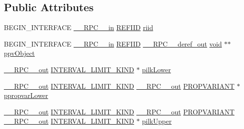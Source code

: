 \subsection*{Public Attributes}
\begin{DoxyCompactItemize}
\item 
B\+E\+G\+I\+N\+\_\+\+I\+N\+T\+E\+R\+F\+A\+CE \hyperlink{rpcsal_8h_a20b7f6da600a05c8b541659f14f7f0e6}{\+\_\+\+\_\+\+R\+P\+C\+\_\+\+\_\+in} \hyperlink{px__win__ds_8c_a80ec49c8ae61e234197d5071d2df497d}{R\+E\+F\+I\+ID} \hyperlink{struct_i_interval_vtbl_a5093e97add4aa256c72f191a990ca814}{riid}
\item 
B\+E\+G\+I\+N\+\_\+\+I\+N\+T\+E\+R\+F\+A\+CE \hyperlink{rpcsal_8h_a20b7f6da600a05c8b541659f14f7f0e6}{\+\_\+\+\_\+\+R\+P\+C\+\_\+\+\_\+in} \hyperlink{px__win__ds_8c_a80ec49c8ae61e234197d5071d2df497d}{R\+E\+F\+I\+ID} \hyperlink{rpcsal_8h_a23bc188526f10656f9c79d950f6c3192}{\+\_\+\+\_\+\+R\+P\+C\+\_\+\+\_\+deref\+\_\+out} \hyperlink{sound_8c_ae35f5844602719cf66324f4de2a658b3}{void} $\ast$$\ast$ \hyperlink{struct_i_interval_vtbl_a2432190272c929f87bec2e06fa0475a5}{ppv\+Object}
\item 
\hyperlink{rpcsal_8h_aa518a2c78d44d75f3685c32c455c5ed8}{\+\_\+\+\_\+\+R\+P\+C\+\_\+\+\_\+out} \hyperlink{structuredquery_8h_a9a883b8387799efbe99defa438412914}{I\+N\+T\+E\+R\+V\+A\+L\+\_\+\+L\+I\+M\+I\+T\+\_\+\+K\+I\+ND} $\ast$ \hyperlink{struct_i_interval_vtbl_a1e348828daee912b1bfc3bfdddcfc001}{pilk\+Lower}
\item 
\hyperlink{rpcsal_8h_aa518a2c78d44d75f3685c32c455c5ed8}{\+\_\+\+\_\+\+R\+P\+C\+\_\+\+\_\+out} \hyperlink{structuredquery_8h_a9a883b8387799efbe99defa438412914}{I\+N\+T\+E\+R\+V\+A\+L\+\_\+\+L\+I\+M\+I\+T\+\_\+\+K\+I\+ND} \hyperlink{rpcsal_8h_aa518a2c78d44d75f3685c32c455c5ed8}{\+\_\+\+\_\+\+R\+P\+C\+\_\+\+\_\+out} \hyperlink{propidl_8h_ae902c1757cd16052896846fa4ebb88d8}{P\+R\+O\+P\+V\+A\+R\+I\+A\+NT} $\ast$ \hyperlink{struct_i_interval_vtbl_a651120f300ba61843d2a0cc79e305c56}{ppropvar\+Lower}
\item 
\hyperlink{rpcsal_8h_aa518a2c78d44d75f3685c32c455c5ed8}{\+\_\+\+\_\+\+R\+P\+C\+\_\+\+\_\+out} \hyperlink{structuredquery_8h_a9a883b8387799efbe99defa438412914}{I\+N\+T\+E\+R\+V\+A\+L\+\_\+\+L\+I\+M\+I\+T\+\_\+\+K\+I\+ND} \hyperlink{rpcsal_8h_aa518a2c78d44d75f3685c32c455c5ed8}{\+\_\+\+\_\+\+R\+P\+C\+\_\+\+\_\+out} \hyperlink{propidl_8h_ae902c1757cd16052896846fa4ebb88d8}{P\+R\+O\+P\+V\+A\+R\+I\+A\+NT} \hyperlink{rpcsal_8h_aa518a2c78d44d75f3685c32c455c5ed8}{\+\_\+\+\_\+\+R\+P\+C\+\_\+\+\_\+out} \hyperlink{structuredquery_8h_a9a883b8387799efbe99defa438412914}{I\+N\+T\+E\+R\+V\+A\+L\+\_\+\+L\+I\+M\+I\+T\+\_\+\+K\+I\+ND} $\ast$ \hyperlink{struct_i_interval_vtbl_a8857493b9d7786658725be73b3e93a87}{pilk\+Upper}
$$
\end{DoxyCompactItemize}
